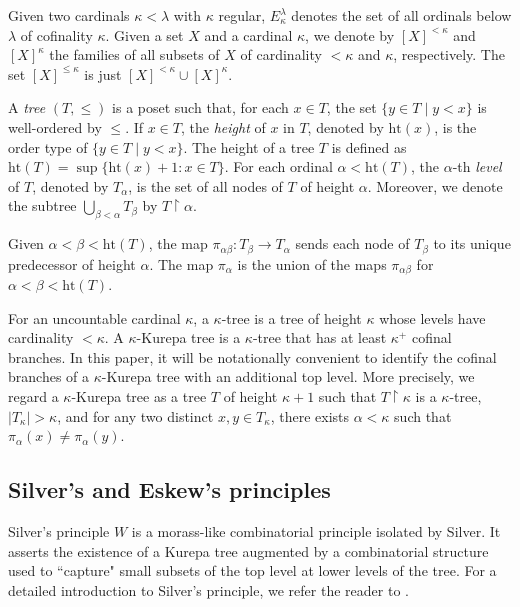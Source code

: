 \documentclass[]{amsart}
\theoremstyle{definition}
\theoremstyle{remark}
\begin{document}
Given two cardinals $\kappa < \lambda$ with $\kappa$ regular, $E^\lambda_\kappa$ denotes the set of all ordinals below $\lambda$ of cofinality $\kappa$. Given a set $X$ and a cardinal $\kappa$, we denote by $[X]^{<\kappa}$ and $[X]^\kappa$ the families of all subsets of $X$ of cardinality $< \kappa$ and $\kappa$, respectively. The set $[X]^{\le \kappa}$ is just $[X]^{<\kappa} \cup [X]^\kappa$.

A \emph{tree} $(T, \le)$ is a poset such that, for each $x \in T$, the set $\{y \in T \mid y < x\}$ is well-ordered by $\le$. If $x \in T$, the \emph{height} of $x$ in $T$, denoted by $\mathrm{ht}(x)$, is the order type of $\{y \in T \mid y < x\}$. The height of a tree $T$ is defined as $\mathrm{ht}(T) = \sup \{\mathrm{ht}(x)+1 : x \in T\}$. For each ordinal $\alpha < \mathrm{ht}(T)$, the $\alpha$-th \emph{level} of $T$, denoted by $T_\alpha$, is the set of all nodes of $T$ of height $\alpha$. Moreover, we denote the subtree $\bigcup_{\beta < \alpha} T_\beta$ by $T \upharpoonright \alpha$.

Given $\alpha < \beta < \mathrm{ht}(T)$, the map $\pi_{\alpha \beta} : T_\beta \rightarrow T_\alpha$ sends each node of $T_\beta$ to its unique predecessor of height $\alpha$. The map $\pi_\alpha$ is the union of the maps $\pi_{\alpha \beta}$ for $\alpha < \beta < \mathrm{ht}(T)$.


For an uncountable cardinal $\kappa$, a $\kappa$-tree is a tree of height $\kappa$ whose levels have cardinality $< \kappa$. A $\kappa$-Kurepa tree is a $\kappa$-tree that has at least $\kappa^+$ cofinal branches. In this paper, it will be notationally convenient to identify the cofinal branches of a $\kappa$-Kurepa tree with an additional top level. More precisely, we regard a $\kappa$-Kurepa tree as a tree $T$ of height $\kappa+1$ such that $T \upharpoonright \kappa$ is a $\kappa$-tree, $|T_\kappa| > \kappa$, and for any two distinct $x,y \in T_\kappa$, there exists $\alpha < \kappa$ such that $\pi_\alpha(x) \neq \pi_\alpha(y)$.

\subsection{Silver's and Eskew's principles}\label{sec:silver}
Silver's principle $W$ is a morass-like combinatorial principle isolated by Silver. It asserts the existence of a Kurepa tree augmented by a combinatorial structure used to ``capture" small subsets of the top level at lower levels of the tree. For a detailed introduction to Silver's principle, we refer the reader to \cite{MR673791, MR823780}.
\end{document}
